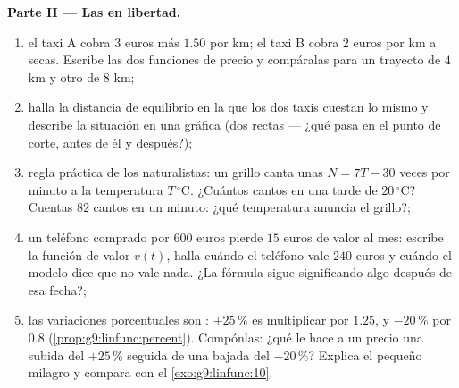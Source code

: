 \begin{problem}
\medskip
\noindent\textbf{Parte II --- Las  en libertad.}
\begin{enumerate}[resume]
  \item el taxi A cobra $3$ euros más $1.50$ por km; el taxi B
        cobra $2$ euros por km a secas. Escribe las dos funciones
        de precio y compáralas para un trayecto de $4$ km y otro de
        $8$ km;
  \item halla la distancia de equilibrio en la que los dos taxis cuestan
        lo mismo y describe la situación en una gráfica (dos
        rectas --- ¿qué pasa en el punto de corte, antes de él
        y después?);
  \item regla práctica de los naturalistas: un grillo canta unas
        $N = 7T - 30$ veces por minuto a la temperatura
        $T\,^\circ$C. ¿Cuántos cantos en una tarde de $20\,^\circ$C?
        Cuentas $82$ cantos en un minuto: ¿qué
        temperatura anuncia el grillo?;
  \item un teléfono comprado por $600$ euros pierde $15$ euros de valor al
        mes: escribe la función de valor $v(t)$, halla cuándo el
        teléfono vale $240$ euros y cuándo el modelo dice que no
        vale nada. ¿La fórmula sigue significando algo
        después de esa fecha?;
  \item las variaciones porcentuales son : $+25\,\%$ es
        multiplicar por $1.25$, y $-20\,\%$ por $0.8$
        (\cref{prop:g9:linfunc:percent}). Compónlas: ¿qué le
        hace a un precio una subida del $+25\,\%$ seguida de una bajada del $-20\,\%$?
        Explica el pequeño milagro y compara con el
        \cref{exo:g9:linfunc:10}.
\end{enumerate}


\end{problem}
